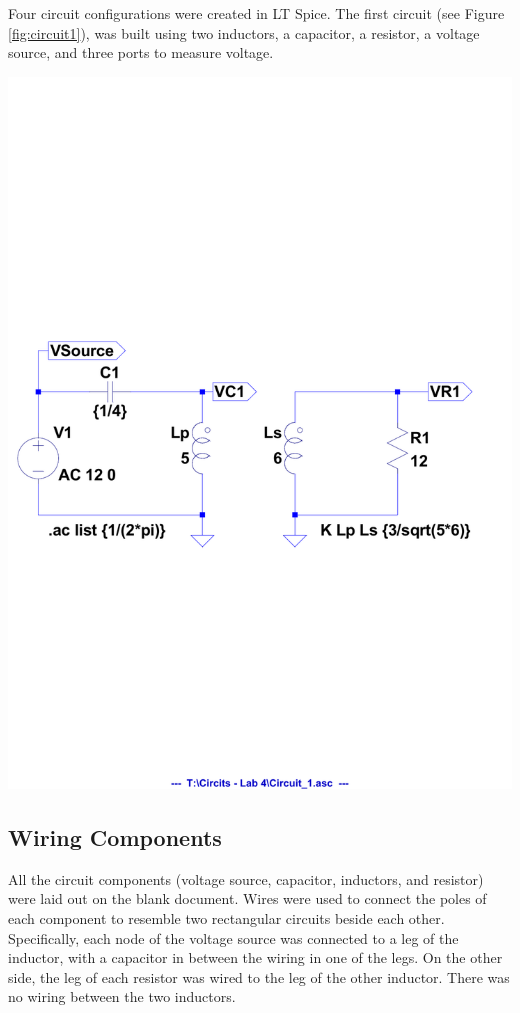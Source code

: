 \documentclass[journal]{IEEEtran}
\begin{document}
\noindent Four circuit configurations were created in LT Spice. The first circuit (see Figure \ref{fig:circuit1}), was built using two inductors, a capacitor, a resistor, a voltage source, and three ports to measure voltage.

\begingroup
    \centering
    \medskip
    \includegraphics[clip, trim=0.0cm 10cm 0.0cm 10cm, width=\columnwidth]{images/labx_3.pdf}
    \label{fig:circuit1}
    \medskip
\endgroup

\subsection{Wiring Components}

\noindent All the circuit components (voltage source, capacitor, inductors, and resistor) were laid out on the blank document. Wires were used to connect the poles of each component to resemble two rectangular circuits beside each other. Specifically, each node of the voltage source was connected to a leg of the inductor, with a capacitor in between the wiring in one of the legs. On the other side, the leg of each resistor was wired to the leg of the other inductor. There was no wiring between the two inductors. \\
\end{document}
